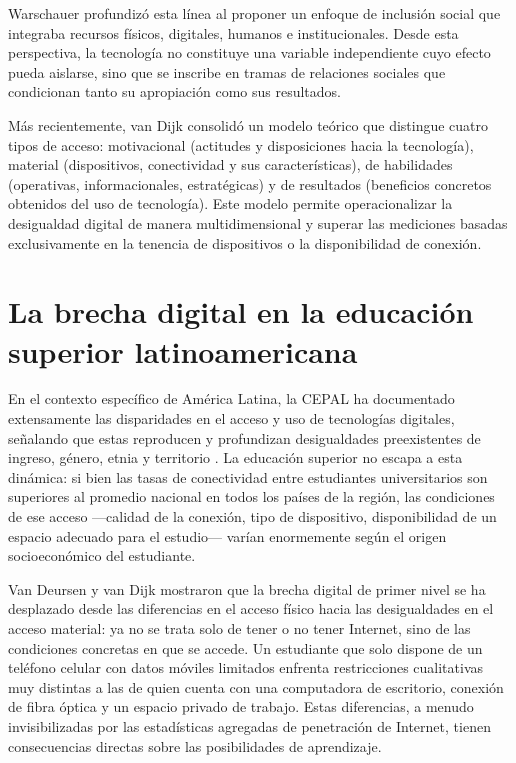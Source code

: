 Warschauer \autocite{2562-WARSCHAUER2004} profundizó esta línea al proponer un enfoque de inclusión social que integraba recursos físicos, digitales, humanos e institucionales. Desde esta perspectiva, la tecnología no constituye una variable independiente cuyo efecto pueda aislarse, sino que se inscribe en tramas de relaciones sociales que condicionan tanto su apropiación como sus resultados.

Más recientemente, van Dijk \autocite{2563-VANDIJK2020} consolidó un modelo teórico que distingue cuatro tipos de acceso: motivacional (actitudes y disposiciones hacia la tecnología), material (dispositivos, conectividad y sus características), de habilidades (operativas, informacionales, estratégicas) y de resultados (beneficios concretos obtenidos del uso de tecnología). Este modelo permite operacionalizar la desigualdad digital de manera multidimensional y superar las mediciones basadas exclusivamente en la tenencia de dispositivos o la disponibilidad de conexión.


\section{La brecha digital en la educación superior latinoamericana}
En el contexto específico de América Latina, la CEPAL ha documentado extensamente las disparidades en el acceso y uso de tecnologías digitales, señalando que estas reproducen y profundizan desigualdades preexistentes de ingreso, género, etnia y territorio \autocite{2566-CEPAL2021}. La educación superior no escapa a esta dinámica: si bien las tasas de conectividad entre estudiantes universitarios son superiores al promedio nacional en todos los países de la región, las condiciones de ese acceso —calidad de la conexión, tipo de dispositivo, disponibilidad de un espacio adecuado para el estudio— varían enormemente según el origen socioeconómico del estudiante.

Van Deursen y van Dijk \autocite{2564-VANDEURSEN2019} mostraron que la brecha digital de primer nivel se ha desplazado desde las diferencias en el acceso físico hacia las desigualdades en el acceso material: ya no se trata solo de tener o no tener Internet, sino de las condiciones concretas en que se accede. Un estudiante que solo dispone de un teléfono celular con datos móviles limitados enfrenta restricciones cualitativas muy distintas a las de quien cuenta con una computadora de escritorio, conexión de fibra óptica y un espacio privado de trabajo. Estas diferencias, a menudo invisibilizadas por las estadísticas agregadas de penetración de Internet, tienen consecuencias directas sobre las posibilidades de aprendizaje.


